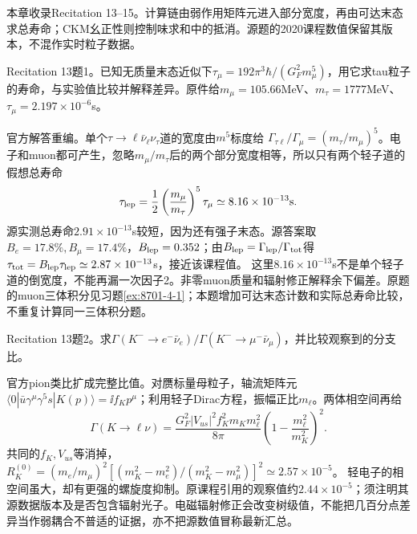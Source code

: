 本章收录Recitation 13--15。计算链由弱作用矩阵元进入部分宽度，再由可达末态求总寿命；CKM幺正性则控制味求和中的抵消。源题的2020课程数值保留其版本，不混作实时粒子数据。
\begin{exercise}\label{ex:rec-13-1}
Recitation 13题1。已知无质量末态近似下$\tau_\mu=192\pi^3\hbar/(G_F^2m_\mu^5)$，用它求tau粒子的寿命，与实验值比较并解释差异。原件给$m_\mu=105.66$MeV、$m_\tau=1777$MeV、$\tau_\mu=2.197\times10^{-6}$s。
\end{exercise}
\begin{solution}
官方解答重编。单个$\tau\to\ell\bar\nu_\ell\nu_\tau$道的宽度由$m^5$标度给
$\Gamma_{\tau\ell}/\Gamma_\mu=(m_\tau/m_\mu)^5$。电子和muon都可产生，忽略$m_\mu/m_\tau$后的两个部分宽度相等，所以只有两个轻子道的假想总寿命
\begin{equation}
 \tau_{\rm lep}=\frac12\left(\frac{m_\mu}{m_\tau}\right)^5\tau_\mu
 \simeq8.16\times10^{-13}\mathrm{s}.
\end{equation}
源实测总寿命$2.91\times10^{-13}$s较短，因为还有强子末态。源答案取$B_e=17.8\%,B_\mu=17.4\%$，$B_{\rm lep}=0.352$；由$B_{\rm lep}=\Gamma_{\rm lep}/\Gamma_{\rm tot}$得
$\tau_{\rm tot}=B_{\rm lep}\tau_{\rm lep}\simeq2.87\times10^{-13}$s，接近该课程值。
这里$8.16\times10^{-13}$s不是单个轻子道的倒宽度，不能再漏一次因子2。非零muon质量和辐射修正解释余下偏差。原题的muon三体积分见习题\ref{ex:8701-4-1}；本题增加可达末态计数和实际总寿命比较，不重复计算同一三体积分题。
\end{solution}
\begin{exercise}\label{ex:rec-13-2}
Recitation 13题2。求$\Gamma(K^-\to e^-\bar\nu_e)/\Gamma(K^-\to\mu^-\bar\nu_\mu)$，并比较观察到的分支比。
\end{exercise}
\begin{solution}
官方pion类比扩成完整比值。对赝标量母粒子，轴流矩阵元$\langle0|\bar u\gamma^\mu\gamma^5s|K(p)\rangle=\ii f_Kp^\mu$；利用轻子Dirac方程，振幅正比$m_\ell$。两体相空间再给
\begin{equation}
 \Gamma(K\to\ell\nu)=\frac{G_F^2|V_{us}|^2 f_K^2m_Km_\ell^2}{8\pi}
 \left(1-\frac{m_\ell^2}{m_K^2}\right)^2.
\end{equation}
共同的$f_K,V_{us}$等消掉，
$R_K^{(0)}=(m_e/m_\mu)^2[(m_K^2-m_e^2)/(m_K^2-m_\mu^2)]^2\simeq2.57\times10^{-5}$。
轻电子的相空间虽大，却有更强的螺旋度抑制。原课程引用的观察值约$2.44\times10^{-5}$；须注明其源数据版本及是否包含辐射光子。电磁辐射修正会改变树级值，不能把几百分点差异当作弱耦合不普适的证据，亦不把源数值冒称最新汇总。
\end{solution}
